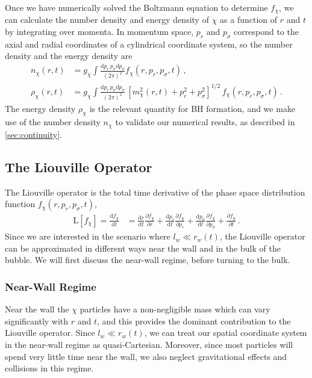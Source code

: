 \documentclass[
onecolumn, %
11pt, %
tightenlines,
superscriptaddress, %
nofootinbib, %
preprintnumbers, %
prd %
]{revtex4-1}
\newcommand{\pd}[2]{\frac{\partial #1}{\partial #2}}                  %
\newcommand{\td}[2]{\frac{\mathrm d #1}{\mathrm d #2}}                %
\newcommand{\upd}{\mathrm d}                                          %
\newcommand{\f}{\ensuremath{f_\chi}\xspace}
\begin{document}
Once we have numerically solved the Boltzmann equation to determine $\f$, we can calculate the number density and energy density of $\chi$ as a function of $r$ and $t$ by integrating over momenta. In momentum space, $p_r$ and $p_\sigma$ correspond to the axial and radial coordinates of a cylindrical coordinate system, so the number density and the energy density are
%
\begin{align}
    n_\chi(r,t)    &= g_\chi\int\!\frac{\upd p_r \, p_\sigma \upd p_\sigma}{(2\pi)^2} \f(r, p_r, p_\sigma,t) \,,\\
    \rho_\chi(r,t) &= g_\chi\int\!\frac{\upd p_r \, p_\sigma \upd p_\sigma}{(2\pi)^2} \,
                          [m_\chi^2(r,t) + p_r^2 + p_\sigma^2]^{1/2} \, \f(r, p_r, p_\sigma,t) \,.
    \label{eq:rho-chi-integral}
\end{align}
%
The energy density $\rho_\chi$ is the relevant quantity for BH formation, and we make use of the number density $n_\chi$ to validate our numerical results, as described in \cref{sec:continuity}.


\subsection{The Liouville Operator}
\label{sec:liouville}

The Liouville operator is the total time derivative of the phase space distribution function $\f(r, p_r, p_\sigma, t)$,
%
\begin{align}
	\boldsymbol{\mathrm L}[\f] = \td{\f}{t}
	&= \td{r}{t} \pd{\f}{r} + \td{p_r}{t} \pd{\f}{p_r} + \td{p_\sigma}{t} \pd{\f}{p_\sigma}
	 + \pd{\f}{t} \,.
    \label{eq:boltzmann-1}
\end{align}
%
Since we are interested in the scenario where $l_w \ll r_w(t)$, the Liouville operator can be approximated in different ways near the wall and in the bulk of the bubble.  We will first discuss the near-wall regime, before turning to the bulk.


\subsubsection{Near-Wall Regime}

Near the wall the $\chi$ particles have a non-negligible mass which can vary significantly with $r$ and $t$, and this provides the dominant contribution to the Liouville operator.  Since $l_w \ll r_w(t)$, we can treat our spatial coordinate system in the near-wall regime as quasi-Cartesian. Moreover, since most particles will spend very little time near the wall, we also neglect gravitational effects and collisions in this regime.
\end{document}
